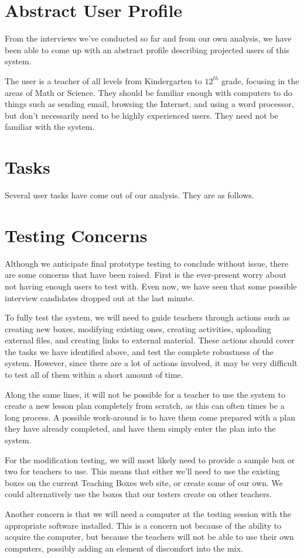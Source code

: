 \documentclass[12pt,titlepage]{article}
\begin{document}
\section{Abstract User Profile}
From the interviews we've conducted so far and from our own analysis, we have
been able to come up with an abstract profile describing projected users of this
system.

The user is a teacher of all levels from Kindergarten to $12^{th}$ grade,
focusing in the areas of Math or Science. They should be familiar enough with
computers to do things such as sending email, browsing the Internet, and using a
word processor, but don't necessarily need to be highly experienced users. They
need not be familiar with the system.

\section{Tasks}
Several user tasks have come out of our analysis.  They are as follows.



\section{Testing Concerns}
Although we anticipate final prototype testing to conclude without issue, there are
some concerns that have been raised.  First is the ever-present worry about not
having enough users to test with.  Even now, we have seen that some possible
interview candidates dropped out at the last minute.

To fully test the system, we will need to guide teachers through actions such as
creating new boxes, modifying existing ones, creating activities, uploading external
files, and creating links to external material.  These actions should cover the
tasks we have identified above, and test the complete robustness of the system.
However, since there are a lot of actions involved, it may be very difficult to
test all of them within a short amount of time.

Along the same lines, it will not be possible for a teacher to use the system to
create a new lesson plan completely from scratch, as this can often times be a
long process.  A possible work-around is to have them come prepared with a plan
they have already completed, and have them simply enter the plan into the system.

For the modification testing, we will most likely need to provide a sample box or
two for teachers to use.  This means that either we'll need to use the existing
boxes on the current Teaching Boxes web site, or create some of our own.  We could
alternatively use the boxes that our testers create on other teachers.

Another concern is that we will need a computer at the testing session with the
appropriate software installed.  This is a concern not because of the ability
to acquire the computer, but because the teachers will not be able to use their
own computers, possibly adding an element of discomfort into the mix.
\end{document}

